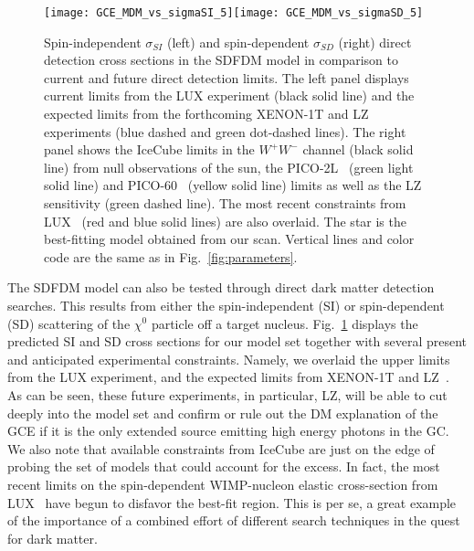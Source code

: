%
\begin{figure}[h]
\begin{center}
\texttt{[image: GCE\_MDM\_vs\_sigmaSI\_5]}\texttt{[image: GCE\_MDM\_vs\_sigmaSD\_5]} 
\caption{Spin-independent $\sigma_{SI}$ (left) and spin-dependent $\sigma_{SD}$ (right) direct detection cross sections in the SDFDM model in comparison to current and future direct detection limits. 
The left panel displays current limits from the LUX experiment (black solid line) and the expected limits from the forthcoming XENON-1T and LZ~\cite{Cushman:2013zza} experiments (blue dashed and green dot-dashed lines).
The right panel shows the IceCube limits in the $W^+W^-$ channel (black solid line) from null observations of the sun,  the PICO-2L~\cite{Amole:2016pye} (green light solid line) and PICO-60~\cite{Amole:2015pla} (yellow solid line) limits as well as the LZ sensitivity (green dashed line). The most recent constraints from LUX~\cite{Akerib:2016lao} (red and blue solid lines) are also overlaid. 
The star is the best-fitting model obtained from our scan. 
Vertical lines and color code are the same as in Fig.~\ref{fig:parameters}.
}
\label{fig:sigma-SI-SD}
\end{center}
\end{figure}
%
The SDFDM model can also be tested through direct dark matter detection searches. This results from either the spin-independent (SI) or spin-dependent (SD) scattering of the $\chi^0$ particle off a target nucleus. Fig.~\ref{fig:sigma-SI-SD} displays the predicted SI and SD cross sections for our model set together with several present and anticipated experimental constraints. Namely, we overlaid the upper limits from the LUX experiment, and the expected limits from XENON-1T and LZ~\cite{Cushman:2013zza}. As can be seen, these future experiments, in particular, LZ, will be able to cut deeply into the model set and confirm or rule out the DM explanation of the GCE if it is the only extended source emitting high energy photons in the GC. 
We also note that available constraints from IceCube are just on the edge of probing the set of models that could account for the excess. In fact, the most recent limits on the spin-dependent WIMP-nucleon elastic cross-section from LUX~\cite{Akerib:2016lao} have begun to disfavor the best-fit region. This is per se, a great example of the importance of a combined effort of different search techniques in the quest for dark matter.    
 

